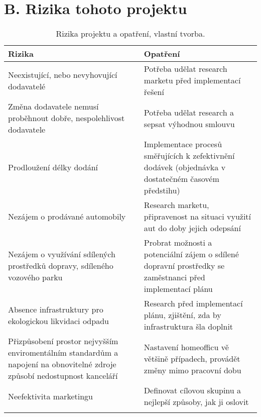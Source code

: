 
\newpage

\section*{B. Rizika tohoto projektu}
\label{sec:Rizika tohoto projektu a ocekavany prinos}

\begin{table}[h]
\centering
\begin{tabularx}{\textwidth}{X|X}
\thickhline
Rizika & Opatření \\ \hline
Neexistující, nebo nevyhovující dodavatelé & Potřeba udělat research marketu před implementací řešení \\
Změna dodavatele nemusí proběhnout dobře, \newline nespolehlivost dodavatele & Potřeba udělat research a sepsat výhodnou smlouvu \\
Prodloužení délky dodání & Implementace procesů směřujících k zefektivnění dodávek (objednávka v dostatečném časovém předstihu) \\
Nezájem o prodávané automobily & Research marketu, připravenost na situaci využití aut do doby jejich odepsání \\
Nezájem o využívání sdílených prostředků dopravy, sdíleného vozového parku & Probrat možnosti a potenciální zájem o sdílené dopravní prostředky se zaměstnanci před implementací plánu \\
Absence infrastruktury pro ekologickou likvidaci odpadu & Research před implementací plánu, zjištění, zda by infrastruktura šla doplnit \\
Přizpůsobení prostor nejvyšším enviromentálním standardům a napojení na obnovitelné zdroje způsobí nedostupnost kanceláří & Nastavení homeofficu vě většině případech, provádět změny mimo pracovní dobu \\
Neefektivita marketingu & Definovat cílovou skupinu a nejlepší způsoby, jak ji oslovit \\ \thickhline
\end{tabularx}
\caption[Rizika projektu a opatření]{Rizika projektu a opatření, vlastní tvorba.}
\label{tab:Rizika projektu a opatreni}
\end{table}